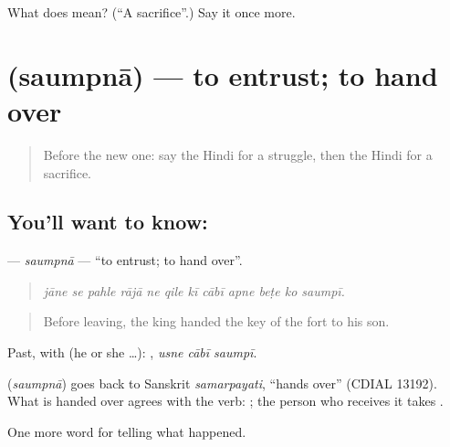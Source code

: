 \begin{tcolorbox}[breakable,colback=teal!4,colframe=teal!35!black,title={Before you move on}]
What does  mean? (\textquotedblleft{}A sacrifice\textquotedblright{}.) Say it once more.
\end{tcolorbox}
\section[\texorpdfstring{\hi{सौंपना} (saumpnā)}{सौंपना (saumpnā)}]{ (saumpnā) — to entrust; to hand over}

\label{lesson:HI-C325-saumpna}



\begin{quote}
Before the new one: say the Hindi for a struggle, then the Hindi for a sacrifice.
\end{quote}

\subsection*{You'll want to know: }
\textbf{} — \emph{saumpnā} — \textquotedblleft{}to entrust; to hand over\textquotedblright{}.

\begin{quote}
           
\end{quote}

\begin{quote}
\emph{jāne se pahle rājā ne qile kī cābī apne beṭe ko saumpī.}
\end{quote}

\begin{quote}
Before leaving, the king handed the key of the fort to his son.
\end{quote}

Past, with  (he or she …):   , \emph{usne cābī saumpī}.

\begin{cousinweb}
\textbf{} (\emph{saumpnā}) goes back to Sanskrit \emph{samarpayati}, \textquotedblleft{}hands over\textquotedblright{} (CDIAL 13192). What is handed over agrees with the verb: \textbf{ }; the person who receives it takes \textbf{}.
\end{cousinweb}

\begin{grammarlens}[title={What you've built}]
One more word for telling what happened.
\end{grammarlens}

